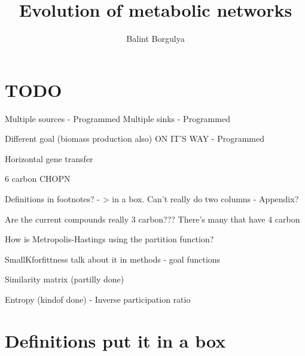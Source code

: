 \documentclass[10pt,a4paper]{article}
\title{Evolution of metabolic networks}
\author{Balint Borgulya}
\begin{document}
	
	
	
	\maketitle
	
	\begin{abstract}
		
	\end{abstract}
	
	\section*{TODO}
	\label{sec:todo}
	
	Multiple sources - Programmed
	Multiple sinks - Programmed

	Different goal (biomass production also) ON IT'S WAY - Programmed

	Horizontal gene transfer


	6 carbon CHOPN

	Definitions in footnotes? - > in a box. Can't really do two columns - Appendix?

	Are the current compounds really 3 carbon??? There's many that have 4 carbon

	How is Metropolis-Hastings using the partition function?

	SmallKforfittness talk about it in methods - goal functions

	Similarity matrix (partilly done)

	Entropy (kindof done) - Inverse participation ratio 

	\section*{Definitions put it in a box}
	
\end{document}
